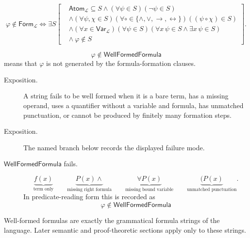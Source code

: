 \begin{remark*}
\[
\varphi\notin\mathsf{Form}_{\mathcal L}
\Longleftrightarrow
\exists S\left[
\begin{aligned}
&\mathsf{Atom}_{\mathcal L}\subseteq S
\land
(\forall\psi\in S)(\neg\psi\in S)\\
&\land
(\forall\psi,\chi\in S)
(\forall\circ\in\{\land,\lor,\to,\leftrightarrow\})
((\psi\circ\chi)\in S)\\
&\land
(\forall x\in\mathsf{Var}_{\mathcal L})(\forall\psi\in S)
(\forall x\,\psi\in S\land \exists x\,\psi\in S)\\
&\land\ \varphi\notin S
\end{aligned}
\right].
\]
\end{remark*}

\begin{remark*}
\[
  \varphi\notin\mathsf{WellFormedFormula}
\] means that \(\varphi\) is not
generated by the formula-formation clauses.
\end{remark*}

\begin{remark*}
\begin{description}
  \item[Exposition.] A string fails to be well formed when it is a bare term, has a missing operand,
uses a quantifier without a variable and formula, has unmatched punctuation, or
cannot be produced by finitely many formation steps.
\end{description}
\end{remark*}

\begin{remark*}
\begin{description}
  \item[Exposition.] The named branch below records the displayed failure mode.
\item[\(\mathsf{WellFormedFormula}\) fails.] \[
\underbrace{f(x)}_{\text{term only}}
\qquad
\underbrace{P(x)\land}_{\text{missing right formula}}
\qquad
\underbrace{\forall P(x)}_{\text{missing bound variable}}
\qquad
\underbrace{(P(x)}_{\text{unmatched punctuation}}.
\]
  In predicate-reading form this is recorded as
  \[
    \varphi\notin\mathsf{WellFormedFormula}
  \]
\end{description}
\end{remark*}

\begin{remark*}[Interpretation]
Well-formed formulas are exactly the grammatical formula strings of the
language. Later semantic and proof-theoretic sections apply only to these
strings.
\end{remark*}

